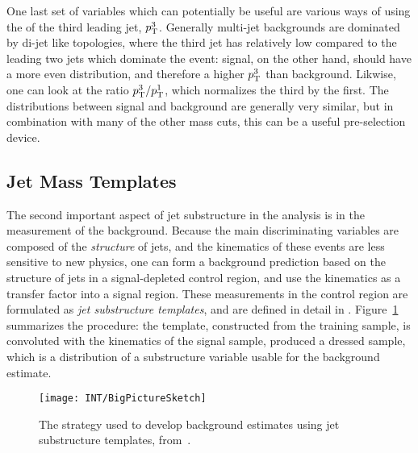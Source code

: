 One last set of variables which can potentially be useful are various ways of using the \pt of the third leading jet, $p_{\text{T}}^3$. Generally multi-jet backgrounds are dominated by di-jet like topologies, where the third jet has relatively low \pt compared to the leading two jets which dominate the event: signal, on the other hand, should have a more even \pt distribution, and therefore a higher $p_{\text{T}}^3$ than background. Likwise, one can look at the ratio $p_{\text{T}}^3/p_{\text{T}}^1$, which normalizes the third \pt by the first. The \pt distributions between signal and background are generally very similar, but in combination with many of the other mass cuts, this can be a useful pre-selection device. 


\subsection{Jet Mass Templates}
	\label{chapter:search:substructure:templates}

The second important aspect of jet substructure in the analysis is in the measurement of the background. Because the main discriminating variables are composed of the \textit{structure} of jets, and the kinematics of these events are less sensitive to new physics, one can form a background prediction based on the structure of jets in a signal-depleted control region, and use the kinematics as a transfer factor into a signal region. These measurements in the control region are formulated as \textit{jet substructure templates}, and are defined in detail in \cite{MassTemplates}. Figure~\ref{fig:search:substructure:template-big-picture} summarizes the procedure: the template, constructed from the training sample, is convoluted with the kinematics of the signal sample, produced a dressed sample, which is a distribution of a substructure variable usable for the background estimate.


\begin{figure}
\centering
\texttt{[image: INT/BigPictureSketch]}
\label{fig:search:substructure:template-big-picture}
\caption{The strategy used to develop background estimates using jet substructure templates, from~\cite{MassTemplates}.}
\end{figure}


